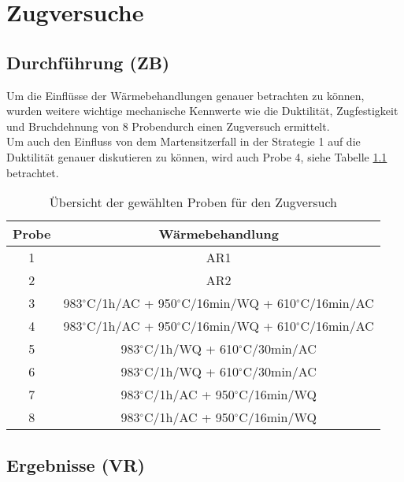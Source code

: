 \chapter{Zugversuche }


\section{Durchführung (ZB)}

Um die Einflüsse der Wärmebehandlungen genauer betrachten zu können, wurden weitere wichtige mechanische Kennwerte wie die Duktilität, Zugfestigkeit und Bruchdehnung von 8 Probendurch einen Zugversuch ermittelt. \\
Um auch den Einfluss von dem Martensitzerfall in der Strategie 1 auf die Duktilität genauer diskutieren zu können, wird auch Probe 4, siehe Tabelle \ref{tab:ubersicht} betrachtet.


\begin{table}[h]
	\centering
	\begin{tabular}{|c|c|}
		\hline 
		Probe & Wärmebehandlung \\ 
		\hline 
		1 & AR1 \\ 
		\hline 
		2 & AR2 \\ 
		\hline 
		3 &  983$^\circ$C/1h/AC + 950$^\circ$C/16min/WQ + 610$^\circ$C/16min/AC \\ 
		\hline 
		4 &  983$^\circ$C/1h/AC + 950$^\circ$C/16min/WQ + 610$^\circ$C/16min/AC \\ 
		\hline 
		5 &  983$^\circ$C/1h/WQ + 610$^\circ$C/30min/AC \\ 
		\hline 
		6 &  983$^\circ$C/1h/WQ + 610$^\circ$C/30min/AC \\ 
		\hline 
		7 &  983$^\circ$C/1h/AC + 950$^\circ$C/16min/WQ \\ 
		\hline 
		8 &  983$^\circ$C/1h/AC + 950$^\circ$C/16min/WQ \\ 
		\hline 
	\end{tabular}	
	\caption{Übersicht der gewählten Proben für den Zugversuch}
	\label{tab:ubersicht} 
\end{table}

\section{Ergebnisse (VR)}

